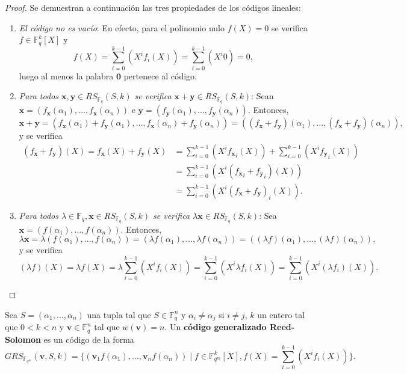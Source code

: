 \begin{proof}
	Se demuestran a continuación las tres propiedades de los códigos lineales:
	\begin{enumerate}
		\item \textit{El código no es vacío}: En efecto, para el polinomio nulo $f(X) = 0$ se verifica $f \in \mathbb{F}_q^k[X]$ y 
		\[f(X) = \sum_{i=0}^{k-1}(X^i f_i(X)) = \sum_{i=0}^{k-1}(X^i 0) = 0,\]
		luego al menos la palabra $\textbf{0}$ pertenece al código.
		\item \textit{Para todos $\textbf{x}, \textbf{y} \in RS_{\mathbb{F}_q}(S, k)$ se verifica $\textbf{x} + \textbf{y} \in RS_{\mathbb{F}_q}(S, k)$}: Sean $\textbf{x} = (f_\textbf{x}(\alpha_1), \dots, f_\textbf{x}(\alpha_n))$ e $\textbf{y} = (f_\textbf{y}(\alpha_1), \dots, f_\textbf{y}(\alpha_n))$. Entonces,
		\[\textbf{x} + \textbf{y} = (f_\textbf{x}(\alpha_1) + f_\textbf{y}(\alpha_1), \dots, f_\textbf{x}(\alpha_n) + f_\textbf{y}(\alpha_n)) = ((f_\textbf{x} + f_\textbf{y})(\alpha_1), \dots, (f_\textbf{x} + f_\textbf{y})(\alpha_n)),\]
		y se verifica
		\begin{align*}
			(f_\textbf{x} + f_\textbf{y})(X) = f_\textbf{x}(X) + f_\textbf{y}(X) &= \sum_{i=0}^{k-1}(X^i {f_\textbf{x}}_i(X)) + \sum_{i=0}^{k-1}(X^i {f_\textbf{y}}_i(X))\\
			&= \sum_{i=0}^{k-1}(X^i({f_\textbf{x}}_i + {f_\textbf{y}}_i)(X))\\
			&= \sum_{i=0}^{k-1}(X^i(f_\textbf{x} + f_\textbf{y})_i(X)).
		\end{align*}
		\item \textit{Para todos $\lambda \in \mathbb{F}_q, \textbf{x} \in RS_{\mathbb{F}_q}(S, k)$ se verifica $\lambda\textbf{x} \in RS_{\mathbb{F}_q}(S, k)$}: Sea $\textbf{x} = (f(\alpha_1), \dots, f(\alpha_n))$. Entonces,
		\[\lambda\textbf{x} = \lambda(f(\alpha_1), \dots, f(\alpha_n)) = (\lambda f(\alpha_1), \dots, \lambda f(\alpha_n)) = ((\lambda f)(\alpha_1), \dots, (\lambda f)(\alpha_n)),\]
		y se verifica
		\[(\lambda f)(X) = \lambda f(X) = \lambda \sum_{i=0}^{k-1}(X^i f_i(X)) = \sum_{i=0}^{k-1}(X^i \lambda f_i(X)) = \sum_{i=0}^{k-1}(X^i (\lambda f_i)(X)).\]
	\end{enumerate}
\end{proof}

\begin{definition}
	Sea $S = (\alpha_1, \dots, \alpha_n)$ una tupla tal que $S \in \mathbb{F}_q^n$ y $\alpha_i \neq \alpha_j$ si $i \neq j$, $k$ un entero tal que $0 < k < n$ y $\textbf{v} \in \mathbb{F}_q^n$ tal que $w(\textbf{v}) = n$. Un \textbf{código generalizado Reed-Solomon} es un código de la forma
	\[GRS_{\mathbb{F}_{q^m}}(\textbf{v}, S, k) = \big\{(\textbf{v}_1f(\alpha_1), \dots, \textbf{v}_nf(\alpha_n)) \mid f \in \mathbb{F}_{q^m}^k[X], f(X) = \sum_{i=0}^{k-1}(X^i f_i(X)) \big\}.\]
\end{definition}

